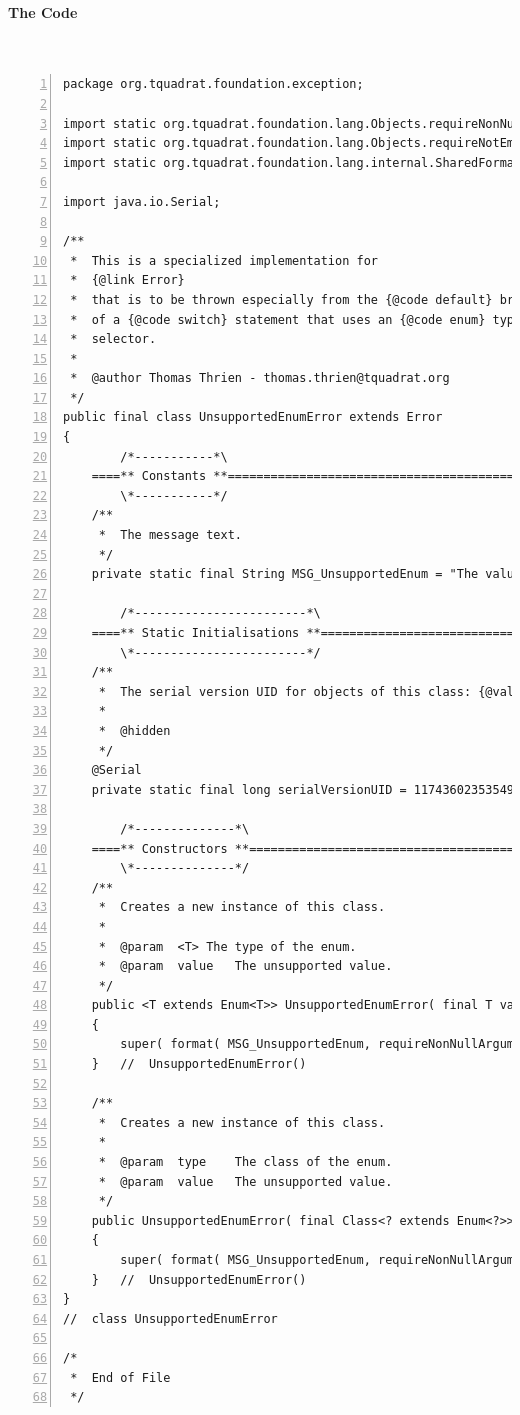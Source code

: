 \documentclass[11pt,a4paper, titlepage, parskip=half, headsepline, footsepline, cleardoublepage=current, headheight=1cm]{scrbook}
\begin{document}
\paragraph{The Code} \
\begin{lstlisting}[numbers=left,caption={UnsupportedEnumError.java}]
package org.tquadrat.foundation.exception;

import static org.tquadrat.foundation.lang.Objects.requireNonNullArgument;
import static org.tquadrat.foundation.lang.Objects.requireNotEmptyArgument;
import static org.tquadrat.foundation.lang.internal.SharedFormatter.format;

import java.io.Serial;

/**
 *  This is a specialized implementation for
 *  {@link Error}
 *  that is to be thrown especially from the {@code default} branch
 *  of a {@code switch} statement that uses an {@code enum} type as
 *  selector.
 *
 *  @author Thomas Thrien - thomas.thrien@tquadrat.org
 */
public final class UnsupportedEnumError extends Error
{
        /*-----------*\
    ====** Constants **==============================================
        \*-----------*/
    /**
     *  The message text.
     */
    private static final String MSG_UnsupportedEnum = "The value '%2$s' of enum class '%1$s' is not supported";

        /*------------------------*\
    ====** Static Initialisations **=================================
        \*------------------------*/
    /**
     *  The serial version UID for objects of this class: {@value}.
     *
     *  @hidden
     */
    @Serial
    private static final long serialVersionUID = 1174360235354917591L;

        /*--------------*\
    ====** Constructors **===========================================
        \*--------------*/
    /**
     *  Creates a new instance of this class.
     *
     *  @param  <T> The type of the enum.
     *  @param  value   The unsupported value.
     */
    public <T extends Enum<T>> UnsupportedEnumError( final T value )
    {
        super( format( MSG_UnsupportedEnum, requireNonNullArgument( value, "value" ).getClass().getName(), value.name() ) );
    }   //  UnsupportedEnumError()

    /**
     *  Creates a new instance of this class.
     *
     *  @param  type    The class of the enum.
     *  @param  value   The unsupported value.
     */
    public UnsupportedEnumError( final Class<? extends Enum<?>> type, final String value )
    {
        super( format( MSG_UnsupportedEnum, requireNonNullArgument( type, "type" ).getName(), requireNotEmptyArgument( value, "value" ) ) );
    }   //  UnsupportedEnumError()
}
//  class UnsupportedEnumError

/*
 *  End of File
 */
 \end{lstlisting}

\listoftables

\lstlistoflistings

\begin{FlushLeft}
\printbibliography
\end{FlushLeft}

\printindex
\end{document}
